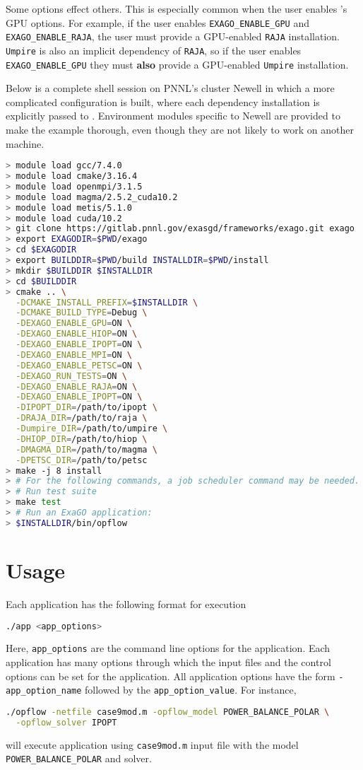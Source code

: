 Some \cmake options effect others.
This is especially common when the user enables \exago's GPU options.
For example, if the user enables \texttt{EXAGO\_ENABLE\_GPU} and \texttt{EXAGO\_ENABLE\_RAJA}, the user must provide a GPU-enabled \texttt{RAJA} installation.
\texttt{Umpire} is also an implicit dependency of \texttt{RAJA}, so if the user enables \texttt{EXAGO\_ENABLE\_GPU} they must \textbf{also} provide a GPU-enabled \texttt{Umpire} installation.

Below is a complete shell session on PNNL's cluster Newell in which a more complicated \exago configuration is built, where each dependency installation is explicitly passed to \cmake.
Environment modules specific to Newell are provided to make the example thorough, even though they are not likely to work on another machine.

\begin{lstlisting}[language=bash,caption={\exago build with all options enabled}]
> module load gcc/7.4.0
> module load cmake/3.16.4
> module load openmpi/3.1.5
> module load magma/2.5.2_cuda10.2
> module load metis/5.1.0
> module load cuda/10.2
> git clone https://gitlab.pnnl.gov/exasgd/frameworks/exago.git exago
> export EXAGODIR=$PWD/exago
> cd $EXAGODIR
> export BUILDDIR=$PWD/build INSTALLDIR=$PWD/install
> mkdir $BUILDDIR $INSTALLDIR
> cd $BUILDDIR
> cmake .. \
  -DCMAKE_INSTALL_PREFIX=$INSTALLDIR \
  -DCMAKE_BUILD_TYPE=Debug \
  -DEXAGO_ENABLE_GPU=ON \
  -DEXAGO_ENABLE_HIOP=ON \
  -DEXAGO_ENABLE_IPOPT=ON \
  -DEXAGO_ENABLE_MPI=ON \
  -DEXAGO_ENABLE_PETSC=ON \
  -DEXAGO_RUN_TESTS=ON \
  -DEXAGO_ENABLE_RAJA=ON \
  -DEXAGO_ENABLE_IPOPT=ON \
  -DIPOPT_DIR=/path/to/ipopt \
  -DRAJA_DIR=/path/to/raja \
  -Dumpire_DIR=/path/to/umpire \
  -DHIOP_DIR=/path/to/hiop \
  -DMAGMA_DIR=/path/to/magma \
  -DPETSC_DIR=/path/to/petsc
> make -j 8 install
> # For the following commands, a job scheduler command may be needed.
> # Run test suite
> make test
> # Run an ExaGO application:
> $INSTALLDIR/bin/opflow
\end{lstlisting}

\section{Usage}

Each \exago application has the following format for execution
\begin{lstlisting}[language=bash]
  ./app <app_options>
\end{lstlisting}
Here, \lstinline{app_options} are the command line options for the application. Each application has many options through which the input files and the control options can be set for the application. All application options have the form \lstinline{-app_option_name} followed by the \lstinline{app_option_value}. 
For instance,
\begin{lstlisting}[language=bash]
  ./opflow -netfile case9mod.m -opflow_model POWER_BALANCE_POLAR \
  -opflow_solver IPOPT
\end{lstlisting}
will execute \opflow application using \lstinline{case9mod.m} input file with the model \lstinline{POWER_BALANCE_POLAR} and \ipopt solver.

